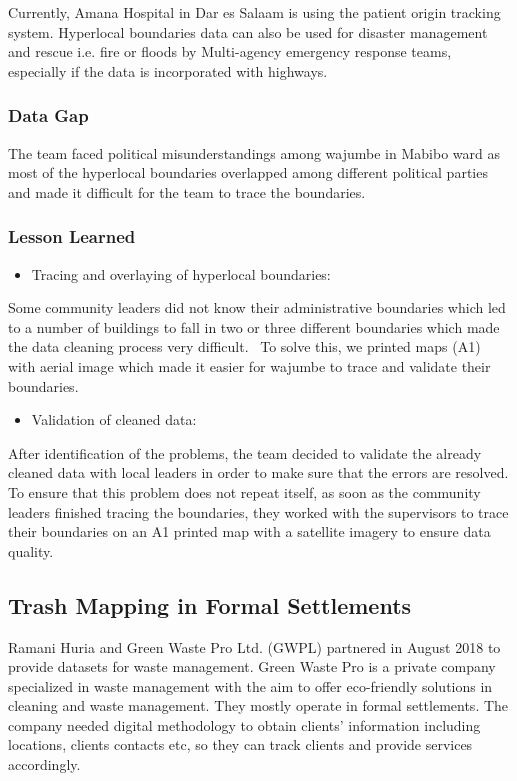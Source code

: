 \documentclass[a4paper,12pt,twoside]{article}
\begin{document}
Currently, Amana Hospital in Dar es Salaam is using the patient origin tracking system. Hyperlocal boundaries data can also be used for disaster management and rescue i.e. fire or floods by Multi-agency emergency response teams, especially if the data is incorporated with highways.

\subsubsection{Data Gap}
The team faced political misunderstandings among wajumbe in Mabibo ward as most of the hyperlocal boundaries overlapped among different political parties and made it difficult for the team to trace the boundaries.

\subsubsection{Lesson Learned}
\begin{itemize}
    \item Tracing and overlaying of hyperlocal boundaries:
\end{itemize}
Some community leaders did not know their administrative boundaries which led to a number of buildings to fall in two or three different boundaries which made the data cleaning process very difficult.
\
To solve this, we printed maps (A1) with aerial image which made it easier for wajumbe to trace and validate their boundaries. 
\begin{itemize}
    \item Validation of cleaned data:
\end{itemize}
After identification of the problems, the team decided to validate the already cleaned data with local leaders in order to make sure that the errors are resolved. To ensure that this problem does not repeat itself, as soon as the community leaders finished tracing the boundaries, they worked with the supervisors to trace their boundaries on an A1 printed map with a satellite imagery to ensure data quality. 


\newpage

\subsection{Trash Mapping in Formal Settlements}

Ramani Huria and Green Waste Pro Ltd. (GWPL) partnered in August 2018 to provide datasets for waste management. Green Waste Pro is a private company specialized in waste management with the aim to offer eco-friendly solutions in cleaning and waste management. They mostly operate in formal settlements. The company needed digital methodology to obtain clients’ information including locations, clients contacts etc, so they can track clients and provide services accordingly.
\end{document}
